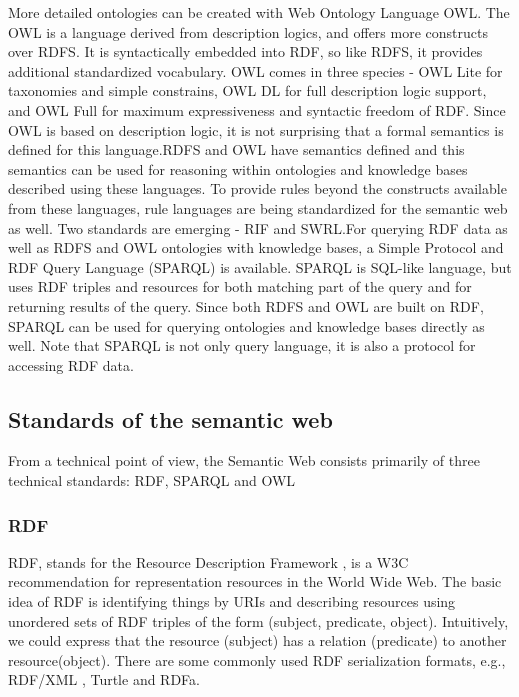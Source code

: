 \documentclass[a4paper,12pt,oneside]{report}
\begin{document}
{{{More detailed ontologies can be created with Web Ontology Language OWL. The OWL is a language derived from description logics, and offers more constructs over RDFS. It is syntactically embedded into RDF, so like RDFS, it provides additional standardized vocabulary. OWL comes in three species - OWL Lite for taxonomies and simple constrains, OWL DL for full description logic support, and OWL Full for maximum expressiveness and syntactic freedom of RDF. Since OWL is based on description logic, it is not surprising that a formal semantics is defined for this language.RDFS and OWL have semantics defined and this semantics can be used for reasoning within ontologies and knowledge bases described using these languages. To provide rules beyond the constructs available from these languages, rule languages are being standardized for the semantic web as well. Two standards are emerging - RIF and SWRL.For querying RDF data as well as RDFS and OWL ontologies with knowledge bases, a Simple Protocol and RDF Query Language (SPARQL) is available. SPARQL is SQL-like language, but uses RDF triples and resources for both matching part of the query and for returning results of the query. Since both RDFS and OWL are built on RDF, SPARQL can be used for querying ontologies and knowledge bases directly as well. Note that SPARQL is not only query language, it is also a protocol for accessing RDF data.}
\subsection{Standards of the semantic web}
{From a technical point of view, the Semantic Web consists primarily of three technical standards: RDF, SPARQL and OWL}
\subsubsection{RDF}
{RDF, stands for the Resource Description Framework , is a W3C  recommendation for representation resources in the World Wide Web. The basic idea of RDF is identifying things by URIs  and describing resources using unordered sets of RDF triples of the form (subject, predicate, object). Intuitively, we could express that the resource (subject) has a relation (predicate) to another resource(object). There are some commonly used RDF serialization formats, e.g., RDF/XML , Turtle  and RDFa.}
}}
\end{document}
